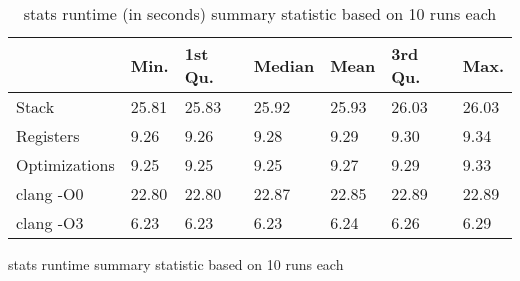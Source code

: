 \begin{table}[h!]
\centering
\begin{tabular}{p{}p{}p{}p{}p{}p{}p{}}
  \hline
 & Min. & 1st Qu. & Median & Mean & 3rd Qu. & Max. \\ 
  \hline
Stack & 25.81 & 25.83 & 25.92 & 25.93 & 26.03 & 26.03 \\ 
  Registers & 9.26 & 9.26 & 9.28 & 9.29 & 9.30 & 9.34 \\ 
  Optimizations & 9.25 & 9.25 & 9.25 & 9.27 & 9.29 & 9.33 \\ 
  clang -O0 & 22.80 & 22.80 & 22.87 & 22.85 & 22.89 & 22.89 \\ 
  clang -O3 & 6.23 & 6.23 & 6.23 & 6.24 & 6.26 & 6.29 \\ 
   \hline
\end{tabular}
\caption{stats runtime summary statistic based on 10 runs each}
\caption{stats runtime (in seconds) summary statistic based on 10 runs each}
\end{table}
